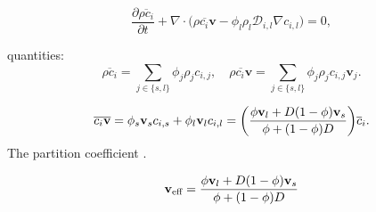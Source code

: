 \documentclass[usenames,dvipsnames,letterpaper,landscape,final]{slides}
\begin{document}
\begin{myslide}

\begin{equation*} \label{eq:specietransport}
		  \frac{\partial \overline{\rho c_{i}}}{\partial t} + \nabla \cdot \big( \overline{\rho c_{i} \mathbf{v}} - \phi_l \rho_l \mathcal{D}_{i,l} \nabla c_{i,l} \big) = 0,
\end{equation*}

\vspace{20pt}

 quantities:
\begin{equation*}
\overline{\rho c_i} = \sum_{j\in \{s,l\}} \phi_j \rho_j c_{i,j}, \quad 
\overline{\rho c_i \mathbf{v}} = \sum_{j\in \{s,l\}} \phi_j \rho_j c_{i,j} \mathbf{v}_j.
\end{equation*}

\begin{equation*}
\label{eq:effectivevel}
		  \overline{c_{i}\bold{v}} = \phi_s \bold{v}_s c_{i,s} + \phi_l \bold{v}_l c_{i,l} = 
		  \bigg( \frac{\phi \bold{v}_l + D(1-\phi) \bold{v}_s}{\phi + (1-\phi) D} \bigg) \overline{c}_i.
\end{equation*}
The partition coefficient . 

\begin{equation*}
\mathbf{v}_{\text{eff}} = \frac{\phi \bold{v}_l + D(1-\phi) \bold{v}_s}{\phi + (1-\phi) D} 
\end{equation*}

\end{myslide}
\end{document}
